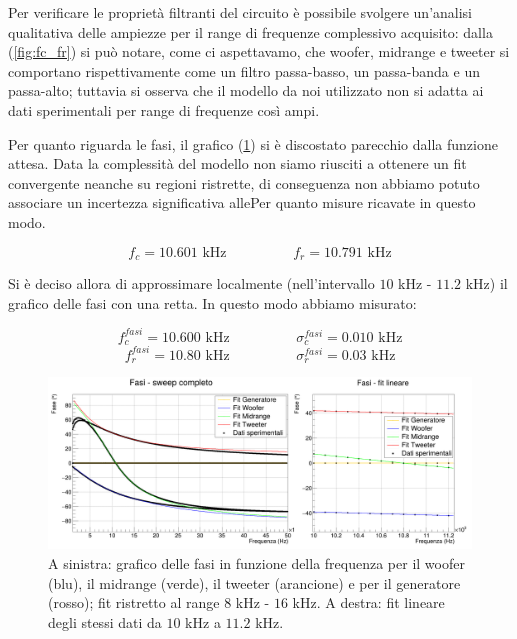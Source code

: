 \documentclass[12pt,italian]{article}
\begin{document}
Per verificare le proprietà filtranti del circuito è possibile svolgere
un'analisi qualitativa delle ampiezze per il range di frequenze complessivo
acquisito: dalla (\cref{fig:fc_fr}) si può notare, come ci aspettavamo, che
woofer, midrange e tweeter si comportano rispettivamente come un filtro
passa-basso, un passa-banda e un passa-alto; tuttavia si osserva che il modello
da noi utilizzato non si adatta ai dati sperimentali per range di frequenze
così ampi.

Per quanto riguarda le fasi, il grafico (\cref{fig:phase_sweep}) si è
discostato parecchio dalla funzione attesa. Data la complessità del modello non
siamo riusciti a ottenere un fit convergente neanche su regioni ristrette, di
conseguenza non abbiamo potuto associare un incertezza significativa allePer
quanto misure ricavate in questo modo.

\begin{equation*}
	f_{c} = 10.601 \text{ kHz} \hspace{2cm} f_{r} = 10.791 \text{ kHz}
\end{equation*}

Si è deciso allora di approssimare localmente (nell'intervallo $10$ kHz -
$11.2$ kHz) il grafico delle fasi con una retta. In questo modo abbiamo
misurato:

\begin{equation*}
	f_{c}^{fasi} = 10.600 \text{ kHz}  \hspace{2cm}  \sigma_c^{fasi} = 0.010 \text{ kHz}
\end{equation*}
\begin{equation*}
	f_{r}^{fasi} = 10.80 \text{ kHz}  \hspace{2cm}  \sigma_r^{fasi} = 0.03 \text{ kHz}
\end{equation*}

\begin{figure}[h]
	\centering
	\includegraphics[width=\textwidth]{fig_fase.png}
	\caption{A sinistra: grafico delle fasi in funzione della frequenza per il woofer
		(blu), il midrange (verde), il tweeter (arancione) e per il generatore (rosso);
		fit ristretto al range $8$ kHz - $16$ kHz. A destra: fit lineare degli stessi dati da $10$ kHz a $11.2$ kHz.}\label{fig:phase_sweep}
\end{figure}
\end{document}
